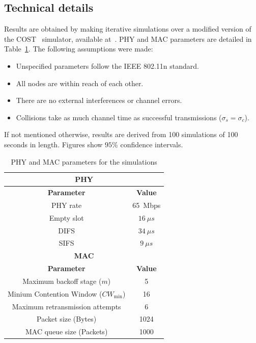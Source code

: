 \documentclass[a4paper,journal]{IEEEtran}
\begin{document}
	\subsection{Technical details}
	Results are obtained by making iterative simulations over a modified version of the COST~\cite{COST} simulator, available at~\cite{sim:parameters}. PHY and MAC parameters are detailed in Table~\ref{tab:mac-params}. The following assumptions were made:
	
	\begin{itemize}
		\item Unspecified parameters follow the IEEE 802.11n standard.
		\item All nodes are within reach of each other.
		\item There are no external interferences or channel errors.
		\item Collisions take as much channel time as successful transmissions ($\sigma_{s}=\sigma_{c}$).
	\end{itemize}
	
	If not mentioned otherwise, results are derived from 100 simulations of 100 seconds in length. Figures show $95$\% confidence intervals.
	
	\begin{table}
		\centering
		\caption{PHY and MAC parameters for the simulations}
		\label{tab:mac-params}
		\begin{tabular}{|c|c|}
			\hline
			\multicolumn{2}{|c|}{{\bfseries PHY}}\\
			\hline
			{\bfseries Parameter} & {\bfseries Value}\\
			\hline
			PHY rate & 65~Mbps\\
			Empty slot & $16~\mu s$\\
			DIFS & $34~\mu s$\\
			SIFS & $9~\mu s$\\
			\hline
			\multicolumn{2}{|c|}{{\bfseries MAC}}\\
			\hline
			{\bfseries Parameter} & {\bfseries Value}\\
			\hline
			Maximum backoff stage ($m$) & 5\\
			Minium Contention Window ($CW_{\min}$) & 16\\
			Maximum retransmission attempts & 6\\
			Packet size (Bytes) & 1024\\
			MAC queue size (Packets) & 1000\\
			\hline
		\end{tabular}
	\end{table}
	
\end{document}
